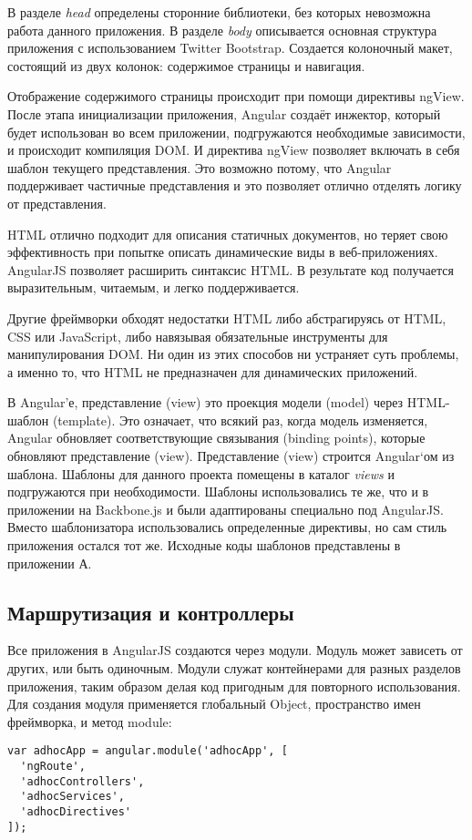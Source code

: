 В разделе \textit{head} определены сторонние библиотеки, без которых невозможна работа данного приложения. В разделе \textit{body} описывается основная структура приложения с использованием Twitter Bootstrap. Создается колоночный макет, состоящий из двух колонок: содержимое страницы и навигация.

Отображение содержимого страницы происходит при помощи директивы ngView. После этапа инициализации приложения, Angular создаёт инжектор, который будет использован во всем приложении, подгружаются необходимые зависимости, и происходит компиляция DOM. И директива ngView позволяет включать в себя шаблон текущего представления. Это возможно потому, что Angular поддерживает частичные представления и это позволяет отлично отделять логику от представления.

HTML отлично подходит для описания статичных документов, но теряет свою эффективность при попытке описать динамические виды в веб-приложениях. AngularJS позволяет расширить синтаксис HTML. В результате код получается выразительным, читаемым, и легко поддерживается.

Другие фреймворки обходят недостатки HTML либо абстрагируясь от HTML, CSS или JavaScript, либо навязывая обязательные инструменты для манипулирования DOM. Ни один из этих способов ни устраняет суть проблемы, а именно то, что HTML не предназначен для динамических приложений.

В Angular'е, представление (view) это проекция модели (model) через HTML-шаблон (template). Это означает, что всякий раз, когда модель изменяется, Angular обновляет соответствующие связывания (binding points), которые обновляют представление (view). Представление (view) строится Angular`ом из шаблона. Шаблоны для данного проекта помещены в каталог \textit{views} и подгружаются при необходимости. Шаблоны использовались те же, что и в приложении на Backbone.js и были адаптированы специально под AngularJS. Вместо шаблонизатора использовались определенные директивы, но сам стиль приложения остался тот же. Исходные коды шаблонов представлены в приложении А.

\subsection{Маршрутизация и контроллеры}

Все приложения в AngularJS создаются через модули. Модуль может зависеть от других, или быть одиночным. Модули служат контейнерами для разных разделов приложения, таким образом делая код пригодным для повторного использования. Для создания модуля применяется глобальный Object, пространство имен фреймворка, и метод module:
\begin{lstlisting}
var adhocApp = angular.module('adhocApp', [
  'ngRoute',
  'adhocControllers',
  'adhocServices',
  'adhocDirectives'
]);
\end{lstlisting}


